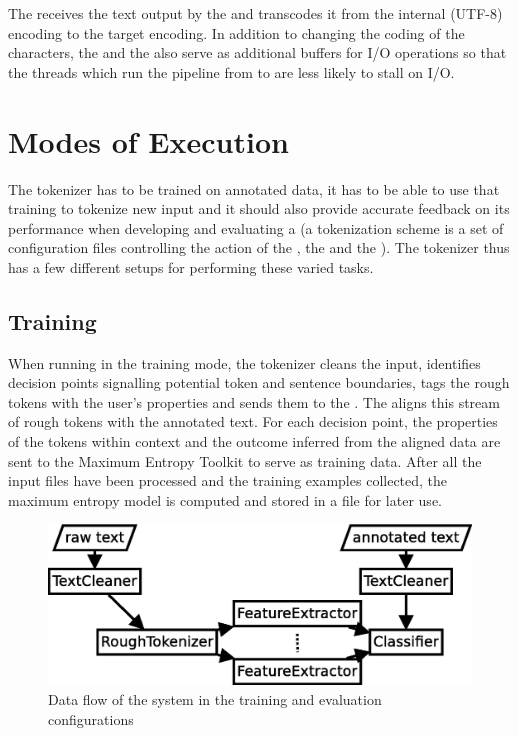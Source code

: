 The  receives the text output by the  and
transcodes it from the internal (UTF-8) encoding to the target encoding. In
addition to changing the coding of the characters, the  and the
 also serve as additional buffers for I/O operations so that
the threads which run the pipeline from  to
 are less likely to stall on I/O.


\section{Modes of Execution}
\label{sec:impl-modes}

The tokenizer has to be trained on annotated data, it has to be able to use
that training to tokenize new input and it should also provide accurate
feedback on its performance when developing and evaluating a
 (a tokenization scheme is a set of configuration
files controlling the action of the , the
 and the ). The tokenizer thus has a
few different setups for performing these varied tasks.

\subsection{Training}
\label{ssec:impl-modes-train}

When running in the training mode, the tokenizer cleans the input, identifies
decision points signalling potential token and sentence boundaries, tags the
rough tokens with the user's properties and sends them to the
. The  aligns this stream of rough tokens
with the annotated text. For each decision point, the properties of the tokens
within context and the outcome inferred from the aligned data are sent to the
Maximum Entropy Toolkit to serve as training data. After all the input files
have been processed and the training examples collected, the maximum entropy
model is computed and stored in a file for later use.

\begin{figure}
  \includegraphics[width=\textwidth]{img/train-parts.eps}
  \caption{Data flow of the system in the training and evaluation
           configurations}
  \label{fig:train-parts}
\end{figure}

